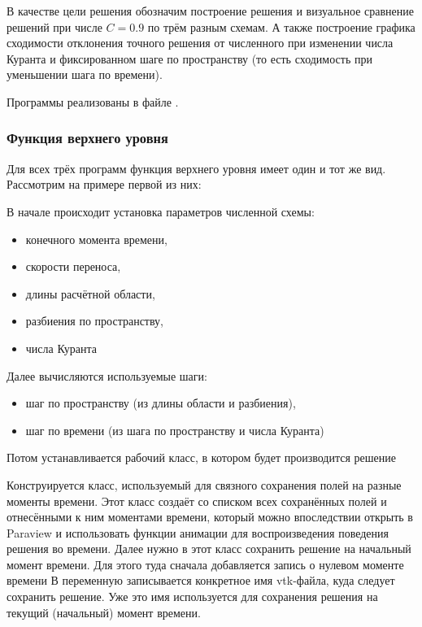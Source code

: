 В качестве цели решения обозначим построение решения и визуальное сравнение решений
при числе $C=0.9$ по трём разным схемам.
А также построение графика сходимости отклонения точного решения
от численного при изменении числа Куранта и фиксированном шаге по пространству
(то есть сходимость при уменьшении шага по времени).

Программы реализованы в файле .

\subsubsection{Функция верхнего уровня}

Для всех трёх программ функция верхнего уровня имеет один и тот же вид.
Рассмотрим на примере первой из них:

В начале происходит установка параметров численной схемы:
\begin{itemize}
\item конечного момента времени,
\item скорости переноса,
\item длины расчётной области,
\item разбиения по пространству,
\item числа Куранта
\end{itemize}


Далее вычисляются используемые шаги:
\begin{itemize}
\item шаг по пространству (из длины области и разбиения),
\item шаг по времени (из шага по пространству и числа Куранта)
\end{itemize}


Потом устанавливается рабочий класс, в котором будет производится решение

Конструируется класс, используемый для связного сохранения
полей на разные моменты времени.
Этот класс создаёт 
со списком всех сохранённых полей и отнесёнными к ним моментами времени,
который можно впоследствии открыть в Paraview и использовать
функции анимации для воспроизведения поведения решения во времени.
Далее нужно в этот класс сохранить решение на начальный момент времени.
Для этого туда сначала добавляется запись о нулевом моменте времени
В переменную  записывается конкретное
имя vtk-файла, куда следует сохранить решение.
Уже это имя используется для сохранения решения на текущий (начальный) момент времени.

